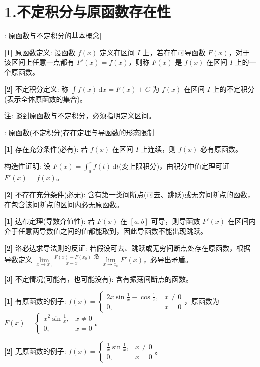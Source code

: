 \documentclass[11pt,a4paper,UTF8]{ctexart}
\begin{document}
\section{1.不定积分与原函数存在性}

\begin{thmbox}[概念[1]: 原函数与不定积分的基本概念]

\textbf{[1]} 原函数定义: 设函数 $f(x)$ 定义在区间 $I$ 上，若存在可导函数 $F(x)$，对于该区间上任意一点都有 $F'(x) = f(x)$，则称 $F(x)$ 是 $f(x)$ 在区间 $I$ 上的一个原函数。

\textbf{[2]} 不定积分定义: 称 $\int f(x)\,\mathrm{d}x = F(x) + C$ 为 $f(x)$ 在区间 $I$ 上的不定积分(表示全体原函数的集合)。

注: 谈到原函数与不定积分，必须指明定义区间。

\end{thmbox}
\begin{thmbox}[定理[1]: 原函数(不定积分)存在定理与导函数的形态限制]

\textbf{[1]} 存在充分条件(必有): 若 $f(x)$ 在区间 $I$ 上连续，则 $f(x)$ 必有原函数。

构造性证明: 设 $F(x) = \int_a^x f(t)\,\mathrm{d}t$(变上限积分)，由积分中值定理可证 $F'(x) = f(x)$。

\textbf{[2]} 不存在充分条件(必无): 含有第一类间断点(可去、跳跃)或无穷间断点的函数，在包含该间断点的区间内必无原函数。

\textbf{[1]} 达布定理(导数介值性): 若 $F(x)$ 在 $[a, b]$ 可导，则导函数 $F'(x)$ 在区间内介于任意两导数值之间的值都能取到，因此导函数不能出现跳跃。

\textbf{[2]} 洛必达求导法则的反证: 若假设可去、跳跃或无穷间断点处存在原函数，根据导数定义 $\lim\limits_{x \to x_0} \frac{F(x)-F(x_0)}{x-x_0} \stackrel{\text{洛}}{=} \lim\limits_{x \to x_0} F'(x)$，必导出矛盾。

\textbf{[3]} 不定情况(可能有，也可能没有): 含有振荡间断点的函数。

\textbf{[1]} 有原函数的例子: $f(x) = \begin{cases} 2x\sin\frac{1}{x} - \cos\frac{1}{x}, & x \neq 0 \\ 0, & x = 0 \end{cases}$，原函数为 $F(x) = \begin{cases} x^2\sin\frac{1}{x}, & x \neq 0 \\ 0, & x = 0 \end{cases}$。

\textbf{[2]} 无原函数的例子: $f(x) = \begin{cases} \frac{1}{x}\sin\frac{1}{x}, & x \neq 0 \\ 0, & x = 0 \end{cases}$。

\end{thmbox}
\end{document}
